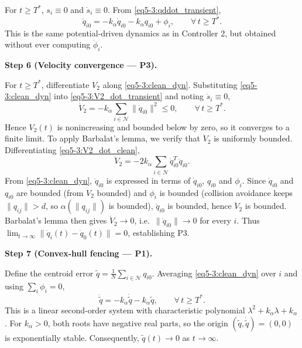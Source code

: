 For $t \ge T^*$, $s_i \equiv 0$ and $\dot{s}_i \equiv 0$.  From \eqref{eq5-3:qddot_transient},
\begin{equation}
	\ddot{q}_{i0} = -k_\alpha \dot{q}_{i0} - k_\alpha q_{i0} + \phi_i,
	\qquad \forall\, t \ge T^*. \label{eq5-3:clean_dyn}
\end{equation}
This is the same potential-driven dynamics as in Controller 2, but obtained without ever
computing $\dot{\phi}_i$.

\medskip\noindent\textbf{Step 6 (Velocity convergence --- P3).}

For $t \ge T^*$, differentiate $V_2$ along \eqref{eq5-3:clean_dyn}.  Substituting
\eqref{eq5-3:clean_dyn} into \eqref{eq5-3:V2_dot_transient} and noting $\dot{s}_i \equiv 0$,
\begin{equation}
	\dot{V}_2 = -k_\alpha\sum_{i\in\mathcal{N}} \|\dot{q}_{i0}\|^2 \le 0,
	\qquad \forall\, t \ge T^*. \label{eq5-3:V2_dot_clean}
\end{equation}
Hence $V_2(t)$ is nonincreasing and bounded below by zero, so it converges to a finite limit.
To apply Barbalat's lemma, we verify that $\ddot{V}_2$ is uniformly bounded.
Differentiating \eqref{eq5-3:V2_dot_clean},
\begin{equation}
	\ddot{V}_2 = -2k_\alpha\sum_{i\in\mathcal{N}} \dot{q}_{i0}^T \ddot{q}_{i0}.
\end{equation}
From \eqref{eq5-3:clean_dyn}, $\ddot{q}_{i0}$ is expressed in terms of $\dot{q}_{i0}$, $q_{i0}$
and $\phi_i$.  Since $\dot{q}_{i0}$ and $q_{i0}$ are bounded (from $V_2$ bounded) and $\phi_i$
is bounded (collision avoidance keeps $\|q_{ij}\| > d$, so $\alpha(\|q_{ij}\|)$ is bounded),
$\ddot{q}_{i0}$ is bounded, hence $\ddot{V}_2$ is bounded.  Barbalat's lemma then gives
$\dot{V}_2 \to 0$, i.e.~$\|\dot{q}_{i0}\| \to 0$ for every $i$.  Thus
$\lim_{t\to\infty} \|\dot{q}_i(t) - \dot{q}_0(t)\| = 0$, establishing P3.

\medskip\noindent\textbf{Step 7 (Convex-hull fencing --- P1).}

Define the centroid error $\tilde{q} = \frac1N\sum_{i\in\mathcal{N}} q_{i0}$.
Averaging \eqref{eq5-3:clean_dyn} over $i$ and using $\sum_i \phi_i = 0$,
\begin{equation}
	\ddot{\tilde{q}} = -k_\alpha \dot{\tilde{q}} - k_\alpha \tilde{q},
	\qquad \forall\, t \ge T^*. \label{eq5-3:centroid}
\end{equation}
This is a linear second-order system with characteristic polynomial
$\lambda^2 + k_\alpha \lambda + k_\alpha$.  For $k_\alpha > 0$, both roots have negative real
parts, so the origin $(\tilde{q},\dot{\tilde{q}}) = (0,0)$ is exponentially stable.
Consequently, $\tilde{q}(t) \to 0$ as $t \to \infty$.

